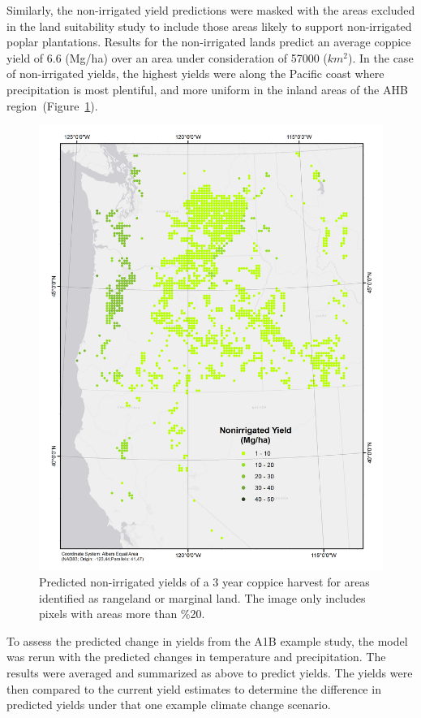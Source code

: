 \documentclass[preprint,review,12pt]{elsarticle}
\begin{document}
Similarly, the non-irrigated yield predictions were masked with the
areas excluded in the land suitability study to include those areas
likely to support non-irrigated poplar plantations.  Results for the
non-irrigated lands predict an average coppice yield of 6.6 (Mg/ha)
over an area under consideration of 57000 ($km^2$).  In the case of
non-irrigated yields, the highest yields were along the Pacific coast
where precipitation is most plentiful, and more uniform in the inland
areas of the \ac{AHB} region~(Figure~\ref{fig:nonirrigated_yield}).

\begin{figure}[hp]
  \centering
  \includegraphics[width=1.0\linewidth]{nonirrigated_yield}
  \caption{Predicted non-irrigated yields of a 3 year coppice
    harvest for areas identified as rangeland or marginal land.  The
    image only includes pixels with areas more than \%20.}
  \label{fig:nonirrigated_yield}
\end{figure}

To assess the predicted change in yields from the A1B example study,
the model was rerun
with the predicted changes in temperature and precipitation.  The
results were averaged and summarized as above to predict yields.  The
yields were then compared to the current yield estimates to determine
the difference in predicted yields under that one example climate
change scenario.
\end{document}
